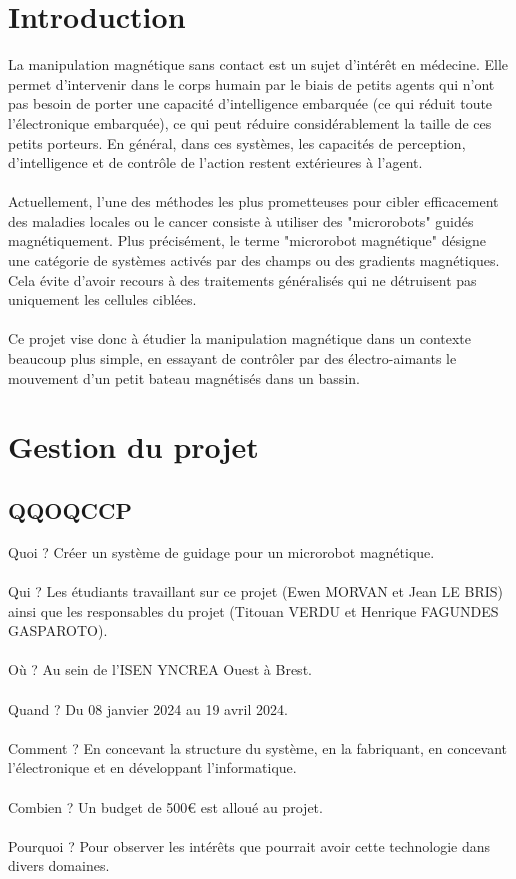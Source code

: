 \documentclass{article}
\begin{document}
\section{Introduction}
    La manipulation magnétique sans contact est un sujet d'intérêt en médecine. Elle permet d'intervenir dans le corps humain par le biais de petits agents qui n'ont pas besoin de porter une capacité d'intelligence embarquée (ce qui réduit toute l'électronique embarquée), ce qui peut réduire considérablement la taille de ces petits porteurs. En général, dans ces systèmes, les capacités de perception, d'intelligence et de contrôle de l'action restent extérieures à l'agent.
    \\\\
    Actuellement, l'une des méthodes les plus prometteuses pour cibler efficacement des maladies locales ou le cancer consiste à utiliser des "microrobots" guidés magnétiquement. Plus précisément, le terme "microrobot magnétique" désigne une catégorie de systèmes activés par des champs ou des gradients magnétiques. Cela évite d'avoir recours à des traitements généralisés qui ne détruisent pas uniquement les cellules ciblées.
    \\\\
    Ce projet vise donc à étudier la manipulation magnétique dans un contexte beaucoup plus simple, en essayant de contrôler par des électro-aimants le mouvement d'un petit bateau magnétisés dans un bassin.


\newpage
\section{Gestion du projet}
    \subsection{QQOQCCP}
        \noindent Quoi ? Créer un système de guidage pour un microrobot magnétique.
        \\\\
        Qui ? Les étudiants travaillant sur ce projet (Ewen MORVAN et Jean LE BRIS) ainsi que les responsables du projet (Titouan VERDU et Henrique FAGUNDES GASPAROTO).
        \\\\
        Où ? Au sein de l'ISEN YNCREA Ouest à Brest.
        \\\\
        Quand ? Du 08 janvier 2024 au 19 avril 2024.
        \\\\
        Comment ? En concevant la structure du système, en la fabriquant, en concevant l'électronique et en développant l'informatique.
        \\\\
        Combien ? Un budget de 500€ est alloué au projet.
        \\\\
        Pourquoi ? Pour observer les intérêts que pourrait avoir cette technologie dans divers domaines.
\end{document}
